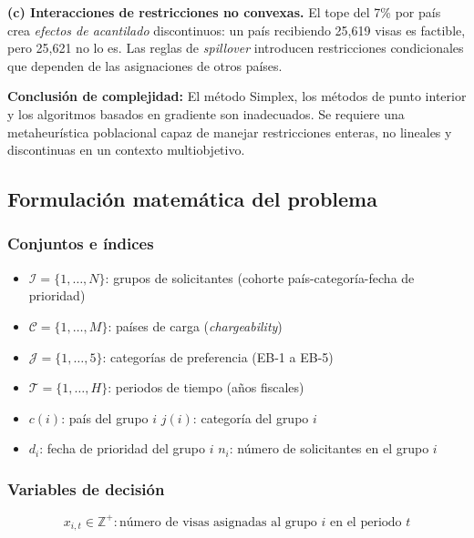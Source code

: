 \documentclass[12pt,letterpaper]{article}
\begin{document}
\textbf{(c) Interacciones de restricciones no convexas.} El tope del 7\% por país crea \textit{efectos de acantilado} discontinuos: un país recibiendo 25,619 visas es factible, pero 25,621 no lo es. Las reglas de \textit{spillover} introducen restricciones condicionales que dependen de las asignaciones de otros países.

\begin{notebox}
\textbf{Conclusión de complejidad:} El método Simplex, los métodos de punto interior y los algoritmos basados en gradiente son inadecuados. Se requiere una metaheurística poblacional capaz de manejar restricciones enteras, no lineales y discontinuas en un contexto multiobjetivo.
\end{notebox}

\subsection{Formulación matemática del problema}

\subsubsection{Conjuntos e índices}

\begin{itemize}
    \item $\mathcal{I} = \{1, \ldots, N\}$: grupos de solicitantes (cohorte país-categoría-fecha de prioridad)
    \item $\mathcal{C} = \{1, \ldots, M\}$: países de carga (\textit{chargeability})
    \item $\mathcal{J} = \{1, \ldots, 5\}$: categorías de preferencia (EB-1 a EB-5)
    \item $\mathcal{T} = \{1, \ldots, H\}$: periodos de tiempo (años fiscales)
    \item $c(i)$: país del grupo $i$ \textcolor{uacjgray}{\textbullet} $j(i)$: categoría del grupo $i$
    \item $d_i$: fecha de prioridad del grupo $i$ \textcolor{uacjgray}{\textbullet} $n_i$: número de solicitantes en el grupo $i$
\end{itemize}

\subsubsection{Variables de decisión}

\begin{formulabox}
\begin{equation}
x_{i,t} \in \mathbb{Z}^+ : \text{número de visas asignadas al grupo } i \text{ en el periodo } t
\label{eq:decision}
\end{equation}
\end{formulabox}
\end{document}
